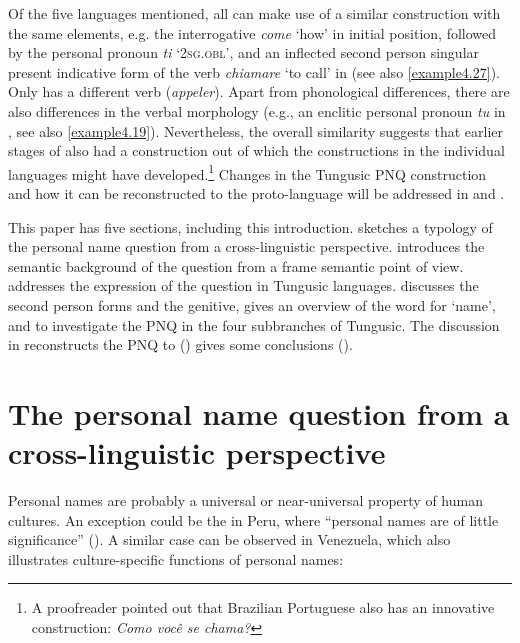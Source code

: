 \documentclass[output=paper,colorlinks,citecolor=brown]{langscibook}
\begin{document}
Of the five languages mentioned, all can make use of a similar construction with the same elements, e.g. the interrogative \textit{come} ‘how’ in initial position, followed by the personal pronoun \textit{ti} ‘2\textsc{sg.obl}’, and an inflected second person singular present indicative form of the verb \textit{chiamare} ‘to call’ in  (see also \ref{example4.27}). Only  has a different verb (\textit{appeler}). Apart from phonological differences, there are also differences in the verbal morphology (e.g., an enclitic personal pronoun \textit{tu} in , see also \ref{example4.19}). Nevertheless, the overall similarity suggests that earlier stages of  also had a construction out of which the constructions in the individual languages might have developed.\footnote{A proofreader pointed out that Brazilian Portuguese also has an innovative construction: \textit{Como você se chama?}} Changes in the Tungusic PNQ construction and how it can be reconstructed to the proto-language will be addressed in  and .

This paper has five sections, including this introduction.  sketches a typology of the personal name question from a cross-linguistic perspective.  introduces the semantic background of the question from a frame semantic point of view.  addresses the expression of the question in Tungusic languages.  discusses the second person forms and the genitive,  gives an overview of the word for ‘name’, and  to  investigate the PNQ in the four subbranches of Tungusic. The discussion in  reconstructs the PNQ to  () gives some conclusions ().


\section{The personal name question from a cross-linguistic perspective}\label{section4.2}

Personal names are probably a universal or near-universal property of human cultures. An exception could be the  in Peru, where “personal names are of little significance” (\citealt[10]{Johnson2003}). A similar case can be observed in Venezuela, which also illustrates culture-specific functions of personal names:
\end{document}
